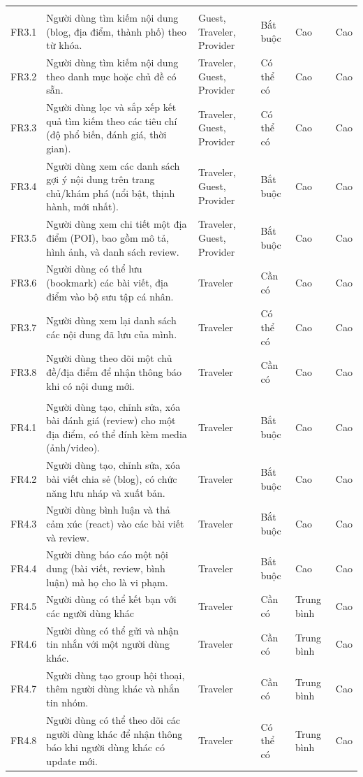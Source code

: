 \begin{longtable}{p{1.7cm} p{5.8cm} p{2.3cm} p{1.8cm} p{1.8cm} p{1.8cm}}
\addlinespace
\multicolumn{6}{l}{\textbf{Module 3: Tìm kiếm \& khám phá nội dung}}\\[2pt]
FR3.1 & Người dùng tìm kiếm nội dung (blog, địa điểm, thành phố) theo từ khóa. & Guest, Traveler, Provider & Bắt buộc & Cao & Cao \\
FR3.2 & Người dùng tìm kiếm nội dung theo danh mục hoặc chủ đề có sẵn. & Traveler, Guest, Provider & Có thể có & Cao & Cao \\
FR3.3 & Người dùng lọc và sắp xếp kết quả tìm kiếm theo các tiêu chí (độ phổ biến, đánh giá, thời gian). & Traveler, Guest, Provider & Có thể có & Cao & Cao \\
FR3.4 & Người dùng xem các danh sách gợi ý nội dung trên trang chủ/khám phá (nổi bật, thịnh hành, mới nhất). & Traveler, Guest, Provider & Bắt buộc & Cao & Cao \\
FR3.5 & Người dùng xem chi tiết một địa điểm (POI), bao gồm mô tả, hình ảnh, và danh sách review. & Traveler, Guest, Provider & Bắt buộc & Cao & Cao \\
FR3.6 & Người dùng có thể lưu (bookmark) các bài viết, địa điểm vào bộ sưu tập cá nhân. & Traveler & Cần có & Cao & Cao \\
FR3.7 & Người dùng xem lại danh sách các nội dung đã lưu của mình. & Traveler & Có thể có & Cao & Cao \\
FR3.8 & Người dùng theo dõi một chủ đề/địa điểm để nhận thông báo khi có nội dung mới. & Traveler & Cần có & Cao & Cao \\

\addlinespace
\multicolumn{6}{l}{\textbf{Module 4: Xây dựng cộng đồng \& nội dung người dùng}}\\[2pt]
FR4.1 & Người dùng tạo, chỉnh sửa, xóa bài đánh giá (review) cho một địa điểm, có thể đính kèm media (ảnh/video). & Traveler & Bắt buộc & Cao & Cao \\
FR4.2 & Người dùng tạo, chỉnh sửa, xóa bài viết chia sẻ (blog), có chức năng lưu nháp và xuất bản. & Traveler & Bắt buộc & Cao & Cao \\
FR4.3 & Người dùng bình luận và thả cảm xúc (react) vào các bài viết và review. & Traveler & Bắt buộc & Cao & Cao \\
FR4.4 & Người dùng báo cáo một nội dung (bài viết, review, bình luận) mà họ cho là vi phạm. & Traveler & Bắt buộc & Cao & Cao \\
FR4.5 & Người dùng có thể kết bạn với các người dùng khác & Traveler & Cần có & Trung bình & Cao \\
FR4.6 & Người dùng có thể gửi và nhận tin nhắn với một người dùng khác. & Traveler & Cần có & Trung bình & Cao \\
FR4.7 & Người dùng tạo group hội thoại, thêm người dùng khác và nhắn tin nhóm. & Traveler & Cần có & Trung bình & Cao \\
FR4.8 & Người dùng có thể theo dõi các người dùng khác để nhận thông báo khi người dùng khác có update mới. & Traveler & Có thể có & Trung bình & Cao \\


\end{longtable}

